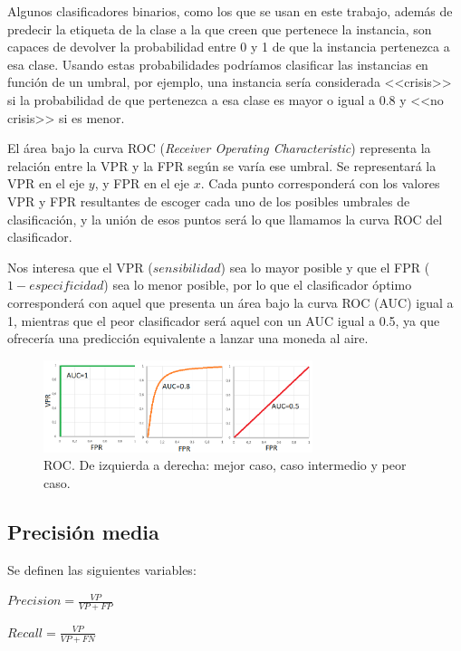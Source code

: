 Algunos clasificadores binarios, como los que se usan en este trabajo, además de predecir la etiqueta de la clase a la que creen que pertenece la instancia, son capaces de devolver la probabilidad entre 0 y 1 de que la instancia pertenezca a esa clase. Usando estas probabilidades podríamos clasificar las instancias en función de un umbral, por ejemplo, una instancia sería considerada <<crisis>> si la probabilidad de que pertenezca a esa clase es mayor o igual a 0.8 y <<no crisis>> si es menor. 

El área bajo la curva ROC (\textit{Receiver Operating Characteristic}) representa la relación entre la VPR y la FPR según se varía ese umbral. Se representará la VPR en el eje $y$, y FPR en el eje $x$. Cada punto corresponderá con los valores VPR y FPR resultantes de escoger cada uno de los posibles umbrales de clasificación, y la unión de esos puntos será lo que llamamos la curva ROC del clasificador.

Nos interesa que el VPR ($sensibilidad$) sea lo mayor posible y que el FPR ($1-especificidad$) sea lo menor posible, por lo que el clasificador óptimo corresponderá con aquel que presenta un área bajo la curva ROC (AUC) igual a 1, mientras que el peor clasificador será aquel con un AUC igual a 0.5, ya que ofrecería una predicción equivalente a lanzar una moneda al aire. 

\begin{figure}[H]
	\centering
	\includegraphics[width=0.7\textwidth]{../img/roc.png}
	\caption{ROC. De izquierda a derecha: mejor caso, caso intermedio y peor caso.}
	\label{fig:roc}
\end{figure} 

\subsection{Precisión media}

Se definen las siguientes variables: 
\begin{center}
	$Precision=\frac{VP}{VP+FP}$
\end{center}
\begin{center}
	$Recall=\frac{VP}{VP+FN}$
\end{center}

